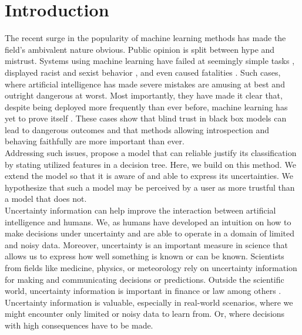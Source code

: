 \documentclass[a4paper,cleardoubleempty,BCOR1cm, 11pt]{report}
\begin{document}
\tableofcontents



\chapter{Introduction}
The recent surge in the popularity of machine learning methods has made the field's ambivalent nature obvious. Public opinion is split between hype and mistrust. 
Systems using machine learning have failed at seemingly simple tasks \cite{kelion2018ces}, displayed racist and sexist behavior \cite{guynn2015google, schlesinger2018let, zou2018ai}, and even caused fatalities \cite{yadron2016tesla}.
Such cases, where artificial intelligence has made severe mistakes are amusing at best and outright dangerous at worst. Most importantly, they have made it clear that, despite being deployed more frequently than ever before, machine learning has yet to prove itself \cite{schlesinger2018let, dikmen2016autonomous, zou2018ai}. 
These cases show that blind trust in black box models can lead to dangerous outcomes and that methods allowing introspection and behaving faithfully are more important than ever.\\
Addressing such issues, \citet{alaniz2019explainable} propose a model that can reliable justify its classification by stating utilized features in a decision tree. Here, we build on this method. We extend the model so that it is aware of and able to express its uncertainties. We hypothesize that such a model may be perceived by a user as more trustful than a model that does not.\\
Uncertainty information can help improve the interaction between artificial intelligence and humans.
We, as humans have developed an intuition on how to make decisions under uncertainty \cite{bland2012different} and are able to operate in a domain of limited and noisy data. Moreover, uncertainty is an important measure in science that allows us to express how well something is known or can be known. Scientists from fields like medicine, physics, or meteorology rely on uncertainty information for making and communicating decisions or predictions. Outside the scientific world, uncertainty information is important in finance or law among others \cite{liu2013toward, d1983legal}.\\
Uncertainty information is valuable, especially in real-world scenarios, where we might encounter only limited or noisy data to learn from. Or, where decisions with high consequences have to be made. 
\end{document}
